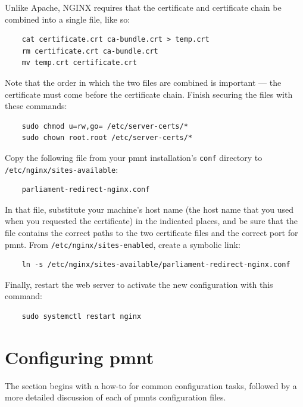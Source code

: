 Unlike Apache, NGINX requires that the certificate and certificate chain be combined into a single file, like so:

\begin{Verbatim}
	cat certificate.crt ca-bundle.crt > temp.crt
	rm certificate.crt ca-bundle.crt
	mv temp.crt certificate.crt
\end{Verbatim}

Note that the order in which the two files are combined is important --- the certificate must come before the certificate chain.  Finish securing the files with these commands:

\begin{Verbatim}
	sudo chmod u=rw,go= /etc/server-certs/*
	sudo chown root.root /etc/server-certs/*
\end{Verbatim}

Copy the following file from your \ac{pmnt} installation's \texttt{conf} directory to \texttt{/etc/nginx/sites-available}:

\begin{Verbatim}
	parliament-redirect-nginx.conf
\end{Verbatim}

In that file, substitute your machine's host name (the host name that you used when you requested the certificate) in the indicated places, and be sure that the file contains the correct paths to the two certificate files and the correct port for \ac{pmnt}.  From \texttt{/etc/nginx/sites-enabled}, create a symbolic link:

\begin{Verbatim}
	ln -s /etc/nginx/sites-available/parliament-redirect-nginx.conf
\end{Verbatim}

Finally, restart the web server to activate the new configuration with this command:

\begin{Verbatim}
	sudo systemctl restart nginx
\end{Verbatim}



\section{Configuring \ac{pmnt}}
\label{section-configuring-pmnt}

The section begins with a how-to for common configuration tasks, followed by a more detailed discussion of each of \acp{pmnt} configuration files.

